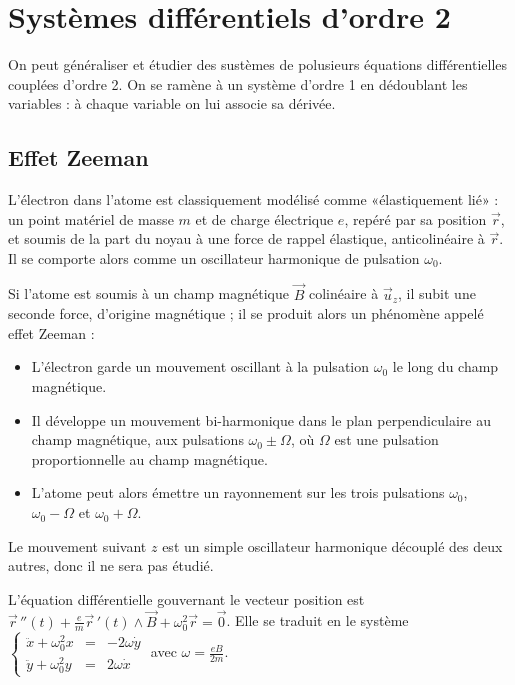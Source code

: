 \section{Systèmes différentiels d'ordre 2}
On peut généraliser et étudier des sustèmes de polusieurs équations différentielles couplées d'ordre 2. On se ramène à un système d'ordre 1 en dédoublant les variables : à chaque variable on lui associe sa dérivée.
\subsection{Effet Zeeman}
L'électron dans l'atome est classiquement modélisé comme «élastiquement lié» : un point matériel de masse $m$ et de charge électrique $e$, repéré par sa position $\vec{r}$, et soumis de la part du noyau à une force de rappel élastique, anticolinéaire à $\vec{r}$. Il se comporte alors comme un oscillateur harmonique de pulsation $\omega_0$.

Si l'atome est soumis à un champ magnétique $\vec{B}$ colinéaire à $\vec{u}_z$, il subit une seconde force, d'origine magnétique ; il se produit alors un phénomène appelé effet Zeeman :
	\begin{itemize}
	\item L'électron garde un mouvement oscillant à la pulsation $\omega_0$ le long du champ magnétique.
	\item Il développe un mouvement bi-harmonique dans le plan perpendiculaire au champ magnétique, aux pulsations $\omega_0\pm\Omega$, où $\Omega$ est une pulsation proportionnelle au champ magnétique.
	\item L'atome peut alors émettre un rayonnement sur les trois pulsations $\omega_0$, $\omega_0-\Omega$ et $\omega_0+\Omega$.
	\end{itemize}
Le mouvement suivant $z$ est un simple oscillateur harmonique découplé des deux autres, donc il ne sera pas étudié.

L'équation différentielle gouvernant le vecteur position est 
$\vec{r}\,''(t)+\frac em\vec{r}\,'(t)\wedge\vec{B}+\omega_0^2\vec{r}=\vec{0}$.
Elle se traduit en le système
$\left\{\begin{matrix}
\ddot{x}+\omega_0^2x &=& -2\omega\dot{y}\\ 
\ddot{y}+\omega_0^2y &=& 2\omega\dot{x}
\end{matrix}\right.$
avec $\omega=\frac{eB}{2m}$.

